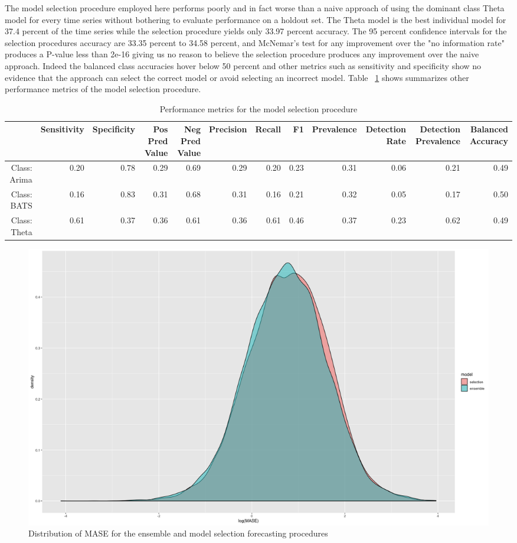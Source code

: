 \documentclass[11pt,3p,review,authoryear]{elsarticle}
\begin{document}
The model selection procedure employed here performs poorly and in fact worse than a naive approach of using the dominant class Theta model for every time series without bothering to evaluate performance on a holdout set. The Theta model is the best individual model for 37.4 percent of the time series while the selection procedure yields only 33.97 percent accuracy. The 95 percent confidence intervals for the selection procedures accuracy are 33.35 percent to 34.58 percent, and McNemar's test for any improvement over the "no information rate" produces a P-value less than 2e-16 giving us no reason to believe the selection procedure produces any improvement over the naive approach. Indeed the balanced class accuracies hover below 50 percent and other metrics such as sensitivity and specificity show no evidence that the approach can select the correct model or avoid selecting an incorrect model. Table ~\ref{tab:a} shows summarizes other performance metrics of the model selection procedure. 

\begin{table}[ht]
\centering
\begin{adjustbox}{width=1\textwidth}
\begin{tabular}{rrrrrrrrrrrr}
  \hline
 & Sensitivity & Specificity & Pos Pred Value & Neg Pred Value & Precision & Recall & F1 & Prevalence & Detection Rate & Detection Prevalence & Balanced Accuracy \\ 
  \hline
Class: Arima & 0.20 & 0.78 & 0.29 & 0.69 & 0.29 & 0.20 & 0.23 & 0.31 & 0.06 & 0.21 & 0.49 \\ 
  Class: BATS & 0.16 & 0.83 & 0.31 & 0.68 & 0.31 & 0.16 & 0.21 & 0.32 & 0.05 & 0.17 & 0.50 \\ 
  Class: Theta & 0.61 & 0.37 & 0.36 & 0.61 & 0.36 & 0.61 & 0.46 & 0.37 & 0.23 & 0.62 & 0.49 \\ 
   \hline
\end{tabular}
\end{adjustbox}
\caption{Performance metrics for the model selection procedure}\label{tab:a}
\end{table}

\begin{figure}[h]
\centering
\includegraphics[width=1.0\textwidth]{distribution}
\caption{Distribution of MASE for the ensemble and model selection forecasting procedures}
\end{figure}
\end{document}
